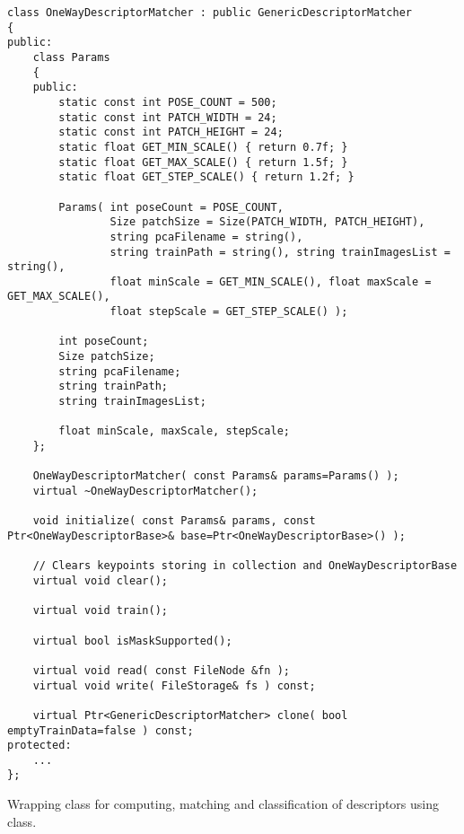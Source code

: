 \begin{lstlisting}
class OneWayDescriptorMatcher : public GenericDescriptorMatcher
{
public:
    class Params
    {
    public:
        static const int POSE_COUNT = 500;
        static const int PATCH_WIDTH = 24;
        static const int PATCH_HEIGHT = 24;
        static float GET_MIN_SCALE() { return 0.7f; }
        static float GET_MAX_SCALE() { return 1.5f; }
        static float GET_STEP_SCALE() { return 1.2f; }

        Params( int poseCount = POSE_COUNT,
                Size patchSize = Size(PATCH_WIDTH, PATCH_HEIGHT),
                string pcaFilename = string(),
                string trainPath = string(), string trainImagesList = string(),
                float minScale = GET_MIN_SCALE(), float maxScale = GET_MAX_SCALE(),
                float stepScale = GET_STEP_SCALE() );

        int poseCount;
        Size patchSize;
        string pcaFilename;
        string trainPath;
        string trainImagesList;

        float minScale, maxScale, stepScale;
    };

    OneWayDescriptorMatcher( const Params& params=Params() );
    virtual ~OneWayDescriptorMatcher();

    void initialize( const Params& params, const Ptr<OneWayDescriptorBase>& base=Ptr<OneWayDescriptorBase>() );

    // Clears keypoints storing in collection and OneWayDescriptorBase
    virtual void clear();

    virtual void train();

    virtual bool isMaskSupported();

    virtual void read( const FileNode &fn );
    virtual void write( FileStorage& fs ) const;

    virtual Ptr<GenericDescriptorMatcher> clone( bool emptyTrainData=false ) const;
protected:
    ...
};
\end{lstlisting}

Wrapping class for computing, matching and classification of descriptors using  class.

